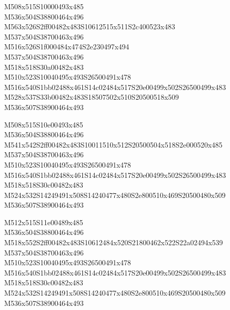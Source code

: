 \documentclass{article}
\begin{document}
\begin{multicols}{5}
\begin{center}

M508x515S10000493x485 %
\\M536x504S38800464x496 %
\\M563x526S2ff00482x483S10612515x511S2c400523x483 %
\\M537x504S38700463x496 %
\\M516x526S1f000484x474S2e230497x494 %
\\M537x504S38700463x496 %
\\M518x518S30a00482x483 %
\\M510x523S10040495x493S26500491x478 %
\\M516x540S1bb02488x461S14c02484x517S20e00499x502S26500499x483 %
\\M528x537S33b00482x483S18507502x510S20500518x509 %
\\M536x507S38900464x493 %
\vfil
\columnbreak

M508x515S10e00493x485 %
\\M536x504S38800464x496 %
\\M541x542S2ff00482x483S10011510x512S20500504x518S2e000520x485 %
\\M537x504S38700463x496 %
\\M510x523S10040495x493S26500491x478 %
\\M516x540S1bb02488x461S14c02484x517S20e00499x502S26500499x483 %
\\M518x518S30c00482x483 %
\\M524x532S14249491x508S14240477x480S2e800510x469S20500480x509 %
\\M536x507S38900464x493 %
\vfil
\columnbreak

M512x515S11e00489x485 %
\\M536x504S38800464x496 %
\\M518x552S2ff00482x483S10612484x520S21800462x522S22a02494x539 %
\\M537x504S38700463x496 %
\\M510x523S10040495x493S26500491x478 %
\\M516x540S1bb02488x461S14c02484x517S20e00499x502S26500499x483 %
\\M518x518S30c00482x483 %
\\M524x532S14249491x508S14240477x480S2e800510x469S20500480x509 %
\\M536x507S38900464x493 %
\vfil
\columnbreak


\end{center}
\end{multicols}
\end{document}
